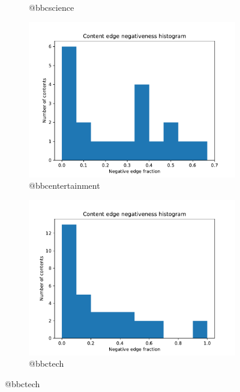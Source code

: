 \documentclass{beamer}
\begin{document}
\begin{frame}[c]
\begin{figure}
\begin{center}
\begin{subfigure}[b]{0.4\textwidth}
				\caption{@bbcscience}
				\label{fig:out/bbcscience200/neg-fraction-content-hist.pdf}
			\end{subfigure}
			\begin{subfigure}[b]{0.4\textwidth}
				\centering
				\includegraphics[width=\textwidth]{out/bbcentertainment200/neg-fraction-content-hist.pdf}
				\caption{@bbcentertainment}
				\label{fig:out/bbcscience200/neg-fraction-content-hist.pdf}
			\end{subfigure}
			\begin{subfigure}[b]{0.4\textwidth}
				\centering
				\includegraphics[width=\textwidth]{out/bbctech200/neg-fraction-content-hist.pdf}
				\caption{@bbctech}
				\label{fig:out/emanews200/neg-fraction-content-hist.pdf}
			\end{subfigure}
		\end{center}
	\end{figure}

\end{frame}
\end{document}
